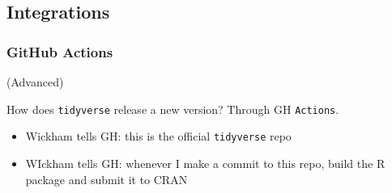 \documentclass{beamer}
\begin{document}
\subsection{Integrations}

\begin{frame}[fragile]
    \frametitle{GitHub Actions}
    (Advanced)

    How does \verb|tidyverse| release a new version? Through GH \verb|Actions|. 

    \begin{itemize}
        \item Wickham tells GH: this is the official \verb|tidyverse| repo
        \item WIckham tells GH: whenever I make a commit to this repo, build the R package and submit it to CRAN
    \end{itemize}
\end{frame}
\end{document}
